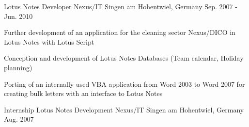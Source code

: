 \begin{cventries}
  \cventry
    {Lotus Notes Developer} %
    {Nexus/IT} %
    {Singen am Hohentwiel, Germany} %
    {Sep. 2007 - Jun. 2010} %
    {
      \begin{cvitems} %
        \item {Further development of an application for the cleaning sector Nexus/DICO in Lotus Notes with Lotus Script}
        \item {Conception and development of Lotus Notes Databases (Team calendar, Holiday planning)}
        \item {Porting of an internally used VBA application from Word 2003 to Word 2007 for creating bulk letters with an interface to Lotus Notes}
      \end{cvitems}
    }

  \cventry
    {Internship Lotus Notes Development} %
    {Nexus/IT} %
    {Singen am Hohentwiel, Germany} %
    {Aug. 2007} %
    {}

\end{cventries}
